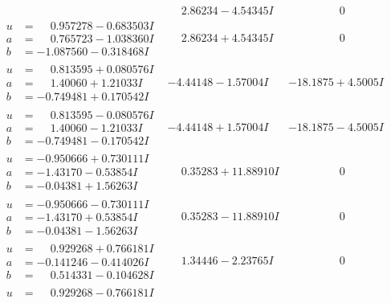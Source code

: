 \documentclass[1p]{elsarticle_modified}
\theoremstyle{definition}
\begin{document}
$$\begin{array}{c|c|c}
 & \phantom{-}2.86234 - 4.54345 I & \phantom{-0.000000 } 0 \\ \hline\begin{aligned}
u &= \phantom{-}0.957278 - 0.683503 I \\
a &= \phantom{-}0.765723 - 1.038360 I \\
b &= -1.087560 - 0.318468 I\end{aligned}
 & \phantom{-}2.86234 + 4.54345 I & \phantom{-0.000000 } 0 \\ \hline\begin{aligned}
u &= \phantom{-}0.813595 + 0.080576 I \\
a &= \phantom{-}1.40060 + 1.21033 I \\
b &= -0.749481 + 0.170542 I\end{aligned}
 & -4.44148 - 1.57004 I & -18.1875 + 4.5005 I \\ \hline\begin{aligned}
u &= \phantom{-}0.813595 - 0.080576 I \\
a &= \phantom{-}1.40060 - 1.21033 I \\
b &= -0.749481 - 0.170542 I\end{aligned}
 & -4.44148 + 1.57004 I & -18.1875 - 4.5005 I \\ \hline\begin{aligned}
u &= -0.950666 + 0.730111 I \\
a &= -1.43170 - 0.53854 I \\
b &= -0.04381 + 1.56263 I\end{aligned}
 & \phantom{-}0.35283 + 11.88910 I & \phantom{-0.000000 } 0 \\ \hline\begin{aligned}
u &= -0.950666 - 0.730111 I \\
a &= -1.43170 + 0.53854 I \\
b &= -0.04381 - 1.56263 I\end{aligned}
 & \phantom{-}0.35283 - 11.88910 I & \phantom{-0.000000 } 0 \\ \hline\begin{aligned}
u &= \phantom{-}0.929268 + 0.766181 I \\
a &= -0.141246 - 0.414026 I \\
b &= \phantom{-}0.514331 - 0.104628 I\end{aligned}
 & \phantom{-}1.34446 - 2.23765 I & \phantom{-0.000000 } 0 \\ \hline\begin{aligned}
u &= \phantom{-}0.929268 - 0.766181 I \\

\end{aligned}
\end{array}$$
\end{document}
